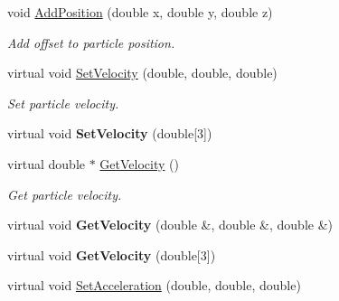 \begin{DoxyCompactItemize}
\item 
\hypertarget{classvtkParticle_aba6ee0d89bcf64fd2fec0c136078bf91}{
void \hyperlink{classvtkParticle_aba6ee0d89bcf64fd2fec0c136078bf91}{AddPosition} (double x, double y, double z)}
\label{classvtkParticle_aba6ee0d89bcf64fd2fec0c136078bf91}

\begin{DoxyCompactList}\small\item\em Add offset to particle position. \item\end{DoxyCompactList}\item 
\hypertarget{classvtkParticle_acceb3ac4dc2f632722548fe2cfcd76b6}{
virtual void \hyperlink{classvtkParticle_acceb3ac4dc2f632722548fe2cfcd76b6}{SetVelocity} (double, double, double)}
\label{classvtkParticle_acceb3ac4dc2f632722548fe2cfcd76b6}

\begin{DoxyCompactList}\small\item\em Set particle velocity. \item\end{DoxyCompactList}\item 
\hypertarget{classvtkParticle_acd67ce39caae78c07f0b7da99c761b1e}{
virtual void {\bfseries SetVelocity} (double\mbox{[}3\mbox{]})}
\label{classvtkParticle_acd67ce39caae78c07f0b7da99c761b1e}

\item 
\hypertarget{classvtkParticle_a024dc1b58c51af734c297686f0e523d6}{
virtual double $\ast$ \hyperlink{classvtkParticle_a024dc1b58c51af734c297686f0e523d6}{GetVelocity} ()}
\label{classvtkParticle_a024dc1b58c51af734c297686f0e523d6}

\begin{DoxyCompactList}\small\item\em Get particle velocity. \item\end{DoxyCompactList}\item 
\hypertarget{classvtkParticle_a7b67128b401745fbf77304700d0185b3}{
virtual void {\bfseries GetVelocity} (double \&, double \&, double \&)}
\label{classvtkParticle_a7b67128b401745fbf77304700d0185b3}

\item 
\hypertarget{classvtkParticle_afef45610742ae3eb7c483f6346b5d8a9}{
virtual void {\bfseries GetVelocity} (double\mbox{[}3\mbox{]})}
\label{classvtkParticle_afef45610742ae3eb7c483f6346b5d8a9}

\item 
\hypertarget{classvtkParticle_a48a10576f6f73409d46b8bd070c108eb}{
virtual void \hyperlink{classvtkParticle_a48a10576f6f73409d46b8bd070c108eb}{SetAcceleration} (double, double, double)}
\label{classvtkParticle_a48a10576f6f73409d46b8bd070c108eb}


\end{DoxyCompactItemize}
